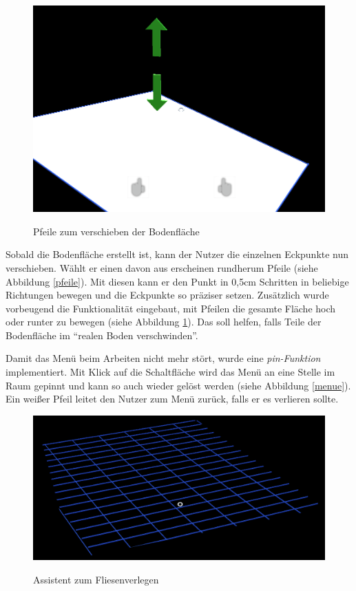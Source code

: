 \begin{figure}[h]
	\begin{center}
		\noindent\includegraphics[scale=0.4]{Resources/Artefakt/bodenUpDown.png}
		\label{pfeileBoden}
		\caption{Pfeile zum verschieben der Bodenfläche}	
	\end{center}
\end{figure}

Sobald die Bodenfläche erstellt ist, kann der Nutzer die einzelnen Eckpunkte nun verschieben. Wählt er einen davon aus erscheinen rundherum Pfeile (siehe Abbildung \ref{pfeile}). Mit diesen kann er den Punkt in 0,5cm Schritten in beliebige Richtungen bewegen und die Eckpunkte so präziser setzen. Zusätzlich wurde vorbeugend die Funktionalität eingebaut, mit Pfeilen die gesamte Fläche hoch oder runter zu bewegen (siehe Abbildung \ref{pfeileBoden}). Das soll helfen, falls Teile der Bodenfläche im \enquote{realen Boden verschwinden}.

Damit das Menü beim Arbeiten nicht mehr stört, wurde eine \textit{pin-Funktion} implementiert. Mit Klick auf die Schaltfläche wird das Menü an eine Stelle im Raum gepinnt und kann so auch wieder gelöst werden (siehe Abbildung \ref{menue}). Ein weißer Pfeil leitet den Nutzer zum Menü zurück, falls er es verlieren sollte.

\begin{figure}[h]
	\begin{center}
		\noindent\includegraphics[scale=0.4]{Resources/Artefakt/verlegeassistent.png}
		\label{assistent}
		\caption{Assistent zum Fliesenverlegen}	
	\end{center}
\end{figure}

